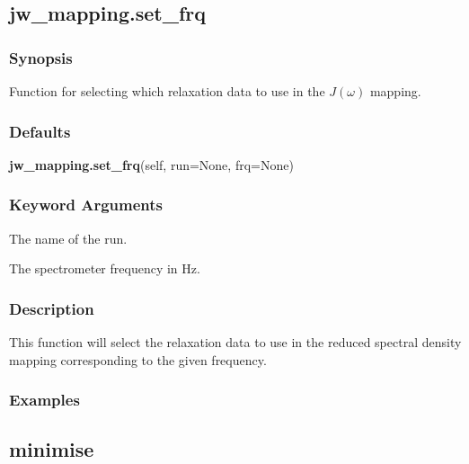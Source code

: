   

 \newpage 

 \subsection{jw\_mapping.set\_frq} 

  
 \subsubsection{Synopsis} 

 Function for selecting which relaxation data to use in the $J(\omega)$ mapping. 
  

  
 \subsubsection{Defaults} 

 \textsf{\textbf{jw\_mapping.set\_frq}(self, run=None, frq=None)} 

  
 \subsubsection{Keyword Arguments} 

   The name of the run.   

   The spectrometer frequency in Hz.  

  

  
 \subsubsection{Description} 

 This function will select the relaxation data to use in the reduced spectral density mapping corresponding to the given frequency. 
  

  
 \subsubsection{Examples} 



  

 \newpage 

 \subsection{minimise} 

